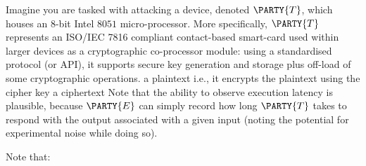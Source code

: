 %



Imagine you are tasked with attacking a device, denoted 
$\PARTY{T}$, 
which houses an $8$-bit Intel $8051$ micro-processor.  More specifically,
$\PARTY{T}$ 
represents an ISO/IEC 7816 compliant contact-based smart-card used within 
larger devices as a cryptographic co-processor module: 
using a standardised protocol (or API), it supports secure key generation 
and storage plus off-load of some cryptographic operations.
{a  plaintext}
{i.e., it encrypts the plaintext using the cipher key}
{a ciphertext}
Note that the ability to observe 
execution latency 
is plausible, because
$\PARTY{E}$ 
can simply record how long
$\PARTY{T}$ 
takes to respond with the output associated with a given input (noting the potential for experimental noise while doing so).




%
Note that:

